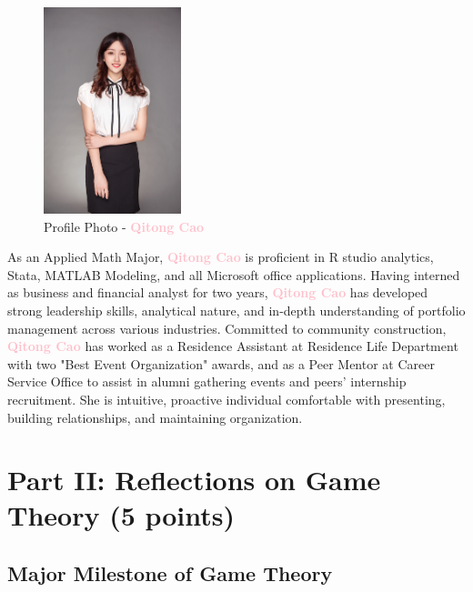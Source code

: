 \documentclass[runningheads]{llncs}
\newcommand{\qitong}[1]{\textcolor{pink}{ #1}}\else
\begin{document}
    \begin{figure}[htp]
\centering %
\includegraphics[width = 4cm]{profile photo.jpg}
\caption{Profile Photo - \qitong{\textbf{Qitong Cao}}}
\label{fig:figure1label}
\end{figure}
  As an Applied Math Major, \qitong{\textbf{Qitong Cao}} is proficient in R studio analytics, Stata, MATLAB Modeling, and all Microsoft office applications. Having interned as business and financial analyst for two years, \qitong{\textbf{Qitong Cao}} has developed strong leadership skills, analytical nature, and in-depth understanding of portfolio management across various industries. 
  Committed to community construction, \qitong{\textbf{Qitong Cao}} has worked as a Residence Assistant at Residence Life Department with two "Best Event Organization" awards, and as a Peer Mentor at Career Service Office to assist in alumni gathering events and peers' internship recruitment. She is intuitive, proactive individual comfortable with presenting, building relationships, and maintaining organization. 



\section{Part II: Reflections on Game Theory (5 points)}
\subsection{Major Milestone of Game Theory} 
\end{document}
